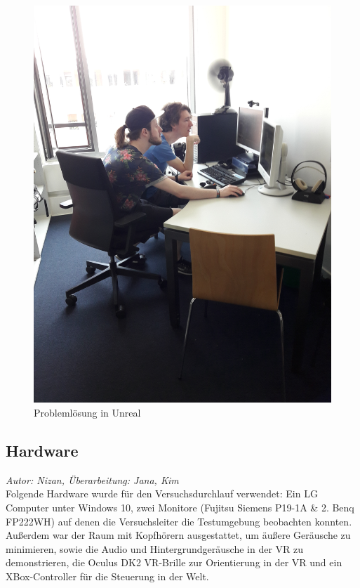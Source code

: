 \documentclass{Bericht}
\begin{document}
		

		\begin{figure}[!htbp] %
			\centering
			\includegraphics[trim = 200mm 0mm 600mm 0mm, clip, height=\linewidth, width=\textheight, keepaspectratio, angle=270]{../Bilder/20170619_102101.jpg} %
			\caption{Problemlösung in Unreal}
			\label{img:porblemloesung}
		\end{figure}
		
\subsection{Hardware}
\label{subsec:hardware}
\textit{Autor: Nizan, Überarbeitung: Jana, Kim}\\
Folgende Hardware wurde für den Versuchsdurchlauf verwendet: Ein LG Computer unter Windows 10, zwei Monitore (Fujitsu Siemens P19-1A \& 2. Benq FP222WH) auf denen die Versuchsleiter die Testumgebung beobachten konnten. Außerdem war der Raum mit Kopfhörern ausgestattet, um äußere Geräusche zu minimieren, sowie die Audio und Hintergrundgeräusche in der VR zu demonstrieren, die Oculus DK2 VR-Brille zur Orientierung in der VR und ein XBox-Controller für die Steuerung in der Welt.
\end{document}

